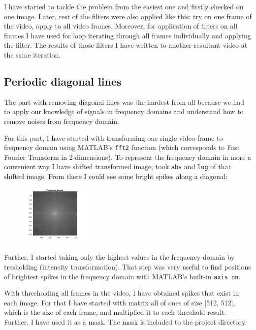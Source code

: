 \documentclass{IEEEtran}
\begin{document}
I have started to tackle the problem from the easiest one and firstly checked on one image. Later, rest of the filters were also applied like this: try on one frame of the video, apply to all video frames. Moreover, for application of filters on all frames I have used for loop iterating through all frames individually and applying the filter. The results of those filters I have written to another resultant video at the same iteration.

\subsection{Periodic diagonal lines}
The part with removing diagonal lines was the hardest from all because we had to apply our knowledge of signals in frequency domains and understand how to remove noises from frequency domain.

For this part, I have started with transforming one single video frame to frequency domain using MATLAB's \texttt{fft2} function (which corresponds to Fast Fourier Transform in 2-dimensions). To represent the frequency domain in more a convenient way I have shifted transformed image, took \texttt{abs} and \texttt{log} of that shifted image. From there I could see some bright spikes along a diagonal:

\begin{figure}[h]
	\centering
	\includegraphics[width=0.3\textwidth]{frequency_domain.png}
\end{figure}

Further, I started taking only the highest values in the frequency domain by tresholding (intensity transformation). That step was very useful to find positions of brightest spikes in the frequency domain with MATLAB's built-in \texttt{axis on}.

With thresholding all frames in the video, I have obtained spikes that exist in each image. For that I have started with matrix all of ones of size [512, 512], which is the size of each frame, and multiplied it to each threshold result. Further, I have used it as a mask. The mask is included to the project directory.
\end{document}
